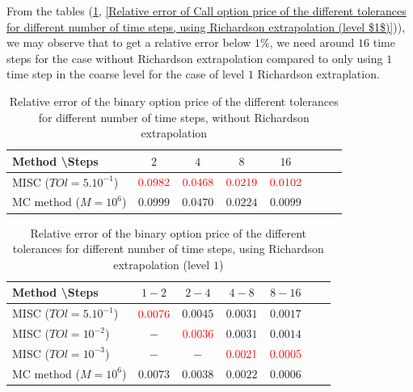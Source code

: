 \documentclass[11pt]{article}
\begin{document}
From the tables (\ref{Relative error of the binary option price of the different tolerances for different number of time steps.}, \ref{Relative error of Call option price of the different tolerances for different number of time steps, using Richardson extrapolation (level $1$)})), we may observe that to get a relative error below $1\%$, we need around $16$ time steps for the case without Richardson extrapolation compared to only using $1$ time step in the coarse level for the case of level $1$ Richardson extraplation. 
\begin{table}[h!]
	\centering
	\begin{tabular}{l*{6}{c}r}
		Method \textbackslash  Steps            & $2$ & $4$ & $8$ & $16$ &   \\
		\hline
		MISC ($TOl=5.10^{-1}$)  & $  {\color{red}0.0982}$ & $ {\color{red} 0.0468}$ & ${\color{red}0.0219}$ & ${\color{red}0.0102}$  \\
		MC method ($M=10^{6}$)   & $\mathbf{0.0999}$  & $\mathbf{0.0470}$  & $\mathbf{0.0224}$ & $\mathbf{0.0099}$  \\	
		\hline
	\end{tabular}
	\caption{Relative error of the binary option price of the different tolerances for different number of time steps, without Richardson extrapolation}
	\label{Relative error of the binary option price of the different tolerances for different number of time steps.}
\end{table}

\begin{table}[h!]
	\centering
	\begin{tabular}{l*{5}{c}r}
		Method \textbackslash  Steps    &$1-2$        & $2-4$ & $4-8$ & $8-16$  \\
		\hline
		MISC ($TOl=5.10^{-1}$)  &${\color{red}0.0076}$ & $0.0045$ & $0.0031$ & $0.0017$  \\
		MISC ($TOl=10^{-2}$)  &$-$ & ${\color{red}0.0036}$ & $0.0031$ & $0.0014$  \\
		MISC ($TOl=10^{-3}$) & $-$ & $-$ & $  {\color{red}0.0021}$ & ${\color{red}0.0005}$   \\
		MC method ($M=10^{6}$)&$ \mathbf{0.0073}$    & $\mathbf{0.0038}$  & $\mathbf{0.0022}$  & $\mathbf{0.0006}$ \\
		\hline
	\end{tabular}
	\caption{Relative error of the binary option price of the different tolerances for different number of time steps, using Richardson extrapolation (level $1$)}
	\label{Relative error of binary option price of the different tolerances for different number of time steps, using Richardson extrapolation (level $1$)}
\end{table}
\end{document}
